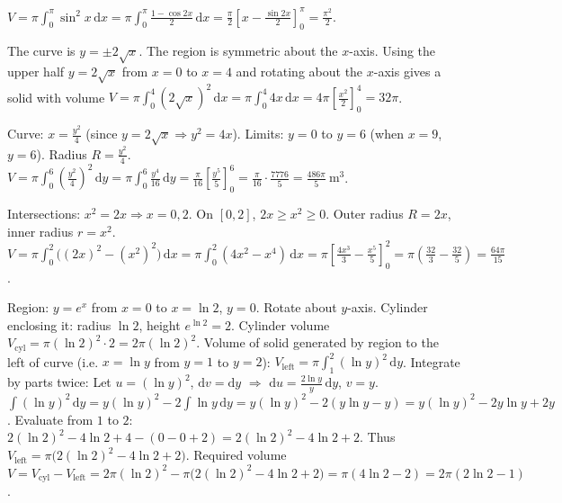 \documentclass[11pt]{article}
\begin{document}
\begin{corrige}[Exercise 1]
$V = \pi \int_0^\pi \sin^2 x\,\mathrm{d}x = \pi \int_0^\pi \frac{1 - \cos 2x}{2}\,\mathrm{d}x = \frac{\pi}{2} \left[ x - \frac{\sin 2x}{2} \right]_0^\pi = \frac{\pi^2}{2}$.
\end{corrige}

\begin{corrige}[Exercise 2]
The curve is $y = \pm 2\sqrt{x}$. The region is symmetric about the $x$-axis. Using the upper half $y = 2\sqrt{x}$ from $x=0$ to $x=4$ and rotating about the $x$-axis gives a solid with volume
$V = \pi \int_0^4 (2\sqrt{x})^2\,\mathrm{d}x = \pi \int_0^4 4x\,\mathrm{d}x = 4\pi \left[ \frac{x^2}{2} \right]_0^4 = 32\pi$.
\end{corrige}

\begin{corrige}[Exercise 3]
Curve: $x = \frac{y^2}{4}$ (since $y = 2\sqrt{x} \Rightarrow y^2 = 4x$). Limits: $y=0$ to $y=6$ (when $x=9$, $y=6$). Radius $R = \frac{y^2}{4}$.
$V = \pi \int_0^6 \left(\frac{y^2}{4}\right)^2\,\mathrm{d}y = \pi \int_0^6 \frac{y^4}{16}\,\mathrm{d}y = \frac{\pi}{16} \left[ \frac{y^5}{5} \right]_0^6 = \frac{\pi}{16} \cdot \frac{7776}{5} = \frac{486\pi}{5}\ \mathrm{m}^3$.
\end{corrige}

\begin{corrige}[Exercise 4]
Intersections: $x^2 = 2x \Rightarrow x=0, 2$. On $[0,2]$, $2x \ge x^2 \ge 0$. Outer radius $R = 2x$, inner radius $r = x^2$.
$V = \pi \int_0^2 \bigl( (2x)^2 - (x^2)^2 \bigr)\,\mathrm{d}x = \pi \int_0^2 (4x^2 - x^4)\,\mathrm{d}x = \pi \left[ \frac{4x^3}{3} - \frac{x^5}{5} \right]_0^2 = \pi \left( \frac{32}{3} - \frac{32}{5} \right) = \frac{64\pi}{15}$.
\end{corrige}

\begin{corrige}[Exercise 5]
Region: $y = e^x$ from $x=0$ to $x=\ln 2$, $y=0$. Rotate about $y$-axis.
Cylinder enclosing it: radius $\ln 2$, height $e^{\ln 2} = 2$. Cylinder volume $V_{\text{cyl}} = \pi (\ln 2)^2 \cdot 2 = 2\pi (\ln 2)^2$.
Volume of solid generated by region to the left of curve (i.e. $x = \ln y$ from $y=1$ to $y=2$):
$V_{\text{left}} = \pi \int_1^2 (\ln y)^2\,\mathrm{d}y$. Integrate by parts twice:
Let $u = (\ln y)^2$, $\mathrm{d}v = \mathrm{d}y$ $\Rightarrow$ $\mathrm{d}u = \frac{2\ln y}{y}\,\mathrm{d}y$, $v = y$.
$\int (\ln y)^2\,\mathrm{d}y = y(\ln y)^2 - 2\int \ln y\,\mathrm{d}y = y(\ln y)^2 - 2(y\ln y - y) = y(\ln y)^2 - 2y\ln y + 2y$.
Evaluate from $1$ to $2$: $2(\ln 2)^2 - 4\ln 2 + 4 - (0 - 0 + 2) = 2(\ln 2)^2 - 4\ln 2 + 2$.
Thus $V_{\text{left}} = \pi \bigl( 2(\ln 2)^2 - 4\ln 2 + 2 \bigr)$.
Required volume $V = V_{\text{cyl}} - V_{\text{left}} = 2\pi (\ln 2)^2 - \pi \bigl( 2(\ln 2)^2 - 4\ln 2 + 2 \bigr) = \pi (4\ln 2 - 2) = 2\pi (2\ln 2 - 1)$.
\end{corrige}
\end{document}

